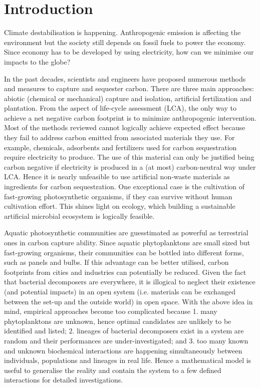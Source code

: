 \documentclass[../thesis.tex]{subfiles} %
\begin{document}
\section{Introduction}

Climate destabilisation is happening.\autocite{notz2016observed,schuur2015climate}  Anthropogenic emission is affecting the environment\autocite{notz2016observed} but the society still depends on fossil fuels to power the economy.\autocite{lotfalipour2010economic}  Since economy has to be developed by using electricity,\autocite{ferguson2000electricity} how can we minimise our impacts to the globe?

In the past decades, scientists and engineers have proposed numerous methods and measures to capture and sequester carbon.\autocite{farrelly2013carbon,yang2008progress}  There are three main approaches: abiotic (chemical or mechanical) capture and isolation, artificial fertilization and plantation.  From the aspect of life-cycle assessment (LCA), the only way to achieve a net negative carbon footprint is to minimize anthropogenic intervention.  Most of the methods reviewed cannot logically achieve expected effect because they fail to address carbon emitted from associated materials they use.  For example, chemicals, adsorbents and fertilizers used for carbon sequestration require electricity to produce.  The use of this material can only be justified being carbon negative if electricity is produced in a (at most) carbon-neutral way under LCA.  Hence it is nearly unfeasible to use artificial non-waste materials as ingredients for carbon sequestration.  One exceptional case is the cultivation of fast-growing photosynthetic organisms,\autocite{farrelly2013carbon} if they can survive without human cultivation effort.  This shines light on ecology, which building a sustainable artificial microbial ecosystem is logically feasible.

Aquatic photosynthetic communities are guesstimated as powerful as terrestrial ones in carbon capture ability.\autocite{SCHLESINGER2013341}  Since aquatic phytoplanktons are small sized but fast-growing organisms, their communities can be bottled into different forms, such as panels and bulbs\autocite{evanson_2019}.  If this advantage can be better utilised, carbon footprints from cities and industries can potentially be reduced.  Given the fact that bacterial decomposers are everywhere, it is illogical to neglect their existence (and potential impacts) in an open system (i.e. materials can be exchanged between the set-up and the outside world) in open space.  With the above idea in mind, empirical approaches become too complicated because 1. many phytoplanktons are unknown, hence optimal candidates are unlikely to be identified and listed; 2. lineages of bacterial decomposers exist in a system are random and their performances are under-investigated; and 3. too many known and unknown biochemical interactions are happening simultaneously between individuals, populations and lineages in real life.  Hence a mathematical model is useful to generalise the reality and contain the system to a few defined interactions for detailed investigations.
\end{document}
